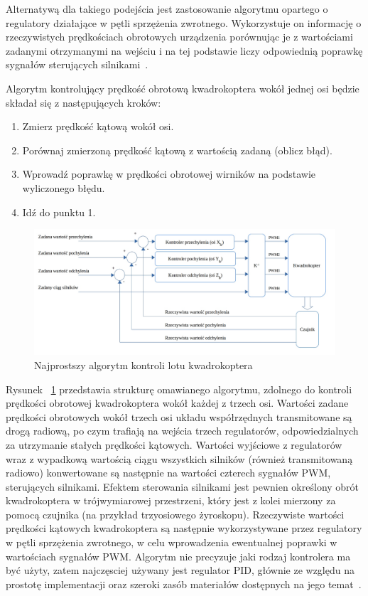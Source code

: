Alternatywą dla takiego podejścia jest zastosowanie algorytmu opartego o regulatory działające w pętli sprzężenia zwrotnego. Wykorzystuje on informację o rzeczywistych prędkościach obrotowych urządzenia porównując je z wartościami zadanymi otrzymanymi na wejściu i na tej podstawie liczy odpowiednią poprawkę sygnałów sterujących silnikami~\cite{quadro9}. 

Algorytm kontrolujący prędkość obrotową kwadrokoptera wokół jednej osi będzie składał się z następujących kroków:

\begin{enumerate}
	\item Zmierz prędkość kątową wokół osi.
	\item Porównaj zmierzoną prędkość kątową z wartością zadaną (oblicz błąd).
	\item Wprowadź poprawkę w prędkości obrotowej wirników na podstawie wyliczonego błędu.
	\item Idź do punktu 1.
\end{enumerate}


\begin{figure}[H]
	\centering
	\includegraphics[width=1.1\textwidth]{Pictures/rate_controll_algorithm2.png}
		\caption[Najprostszy algorytm kontroli lotu kwadrokoptera]{Najprostszy algorytm kontroli lotu kwadrokoptera}
	\label{fig:rate_controll_algorithm}
\end{figure}

Rysunek ~\ref{fig:rate_controll_algorithm} przedstawia strukturę omawianego algorytmu, zdolnego do kontroli prędkości obrotowej kwadrokoptera wokół każdej z trzech osi. Wartości zadane prędkości obrotowych wokół trzech osi układu współrzędnych transmitowane są drogą radiową, po czym trafiają na wejścia trzech regulatorów, odpowiedzialnych za utrzymanie stałych prędkości kątowych. Wartości wyjściowe z regulatorów wraz z wypadkową wartością ciągu wszystkich silników (również transmitowaną radiowo) konwertowane są następnie na wartości czterech sygnałów PWM, sterujących silnikami. Efektem sterowania silnikami jest pewnien określony obrót kwadrokoptera w trójwymiarowej przestrzeni, który jest z kolei mierzony za pomocą czujnika (na przykład trzyosiowego żyroskopu). Rzeczywiste wartości prędkości kątowych kwadrokoptera są następnie wykorzystywane przez regulatory w pętli sprzężenia zwrotnego, w celu wprowadzenia ewentualnej poprawki w wartościach sygnałów PWM. Algorytm nie precyzuje jaki rodzaj kontrolera ma być użyty, zatem najczęsciej używany jest regulator PID, głównie ze względu na prostotę implementacji oraz szeroki zasób materiałów dostępnych na jego temat~\cite{quadro9}.

